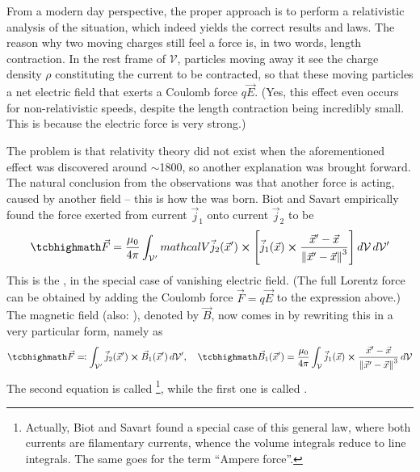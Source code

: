 \documentclass[../class_mech_main.tex]{subfiles}
\DeclareMathOperator{\fpmu}{\frac{\mu_0}{4 \pi}}
\begin{document}
From a modern day perspective, the proper approach is to perform a relativistic analysis of the situation, which indeed yields the correct results and laws. The reason why two moving charges still feel a force is, in two words, length contraction. In the rest frame of $\mathcal{V}$, particles moving away it see the charge density $\rho$ constituting the current to be contracted, so that these moving particles a net electric field that exerts a Coulomb force $q \vec{E}$. (Yes, this effect even occurs for non-relativistic speeds, despite the length contraction being incredibly small. This is because the electric force is very strong.)


The problem is that relativity theory did not exist when the aforementioned effect was discovered around $\sim$1800, so another explanation was brought forward. The natural conclusion from the observations was that another force is acting, caused by another field -- this is how the  was born. Biot and Savart  empirically found the force exerted from current $\vec{j}_1$ onto current $\vec{j}_2$ to be
\begin{equation}
    \eqbox{
        \vec{F}
        = \fpmu \int_{\mathcal{V}'} \\mathcal{V} \vec{j}_2(\vec{x}') \cross \qty[\vec{j}_1(\vec{x}) \cross \frac{\vec{x}' - \vec{x}}{\norm{\vec{x}' - \vec{x}}^3}] \, d\mathcal{V} \, d\mathcal{V}'
    }
\end{equation}
This is the , in the special case of vanishing electric field. (The full Lorentz force can be obtained by adding the Coulomb force $\vec{F} = q \vec{E}$ to the expression above.) The magnetic field  (also: ), denoted by $\vec{B}$, now comes in by rewriting this in a very particular form, namely as
\begin{equation}\label{eq:biot_savart_general}
    \eqbox{
        \vec{F}
        \eqqcolon \int_{\mathcal{V}'} \vec{j}_2(\vec{x}') \cross \vec{B}_1(\vec{x}') \, d\mathcal{V}'
    }
    , \quad
    \eqbox{
        \vec{B}_1(\vec{x}') = \fpmu \int_\mathcal{V} \vec{j}_1(\vec{x}) \cross \frac{\vec{x}' - \vec{x}}{\norm{\vec{x}' - \vec{x}}^3} \, d\mathcal{V}
    }
\end{equation}
The second equation is called \footnote{Actually, Biot and Savart found a special case of this general law, where both currents are filamentary currents, whence the volume integrals reduce to line integrals. The same goes for the term \enquote{Ampere force}.}, while the first one is called .
\end{document}
